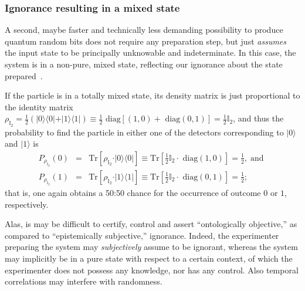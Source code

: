 \documentclass[%
 preprint,
 showpacs,
 showkeys,
 preprintnumbers,
 amsmath,amssymb,
 aps,
 prl,
  longbibliography,
 ]{revtex4-1}
\begin{document}
\subsubsection{Ignorance resulting in a mixed state}

A second, maybe faster and technically less demanding possibility to produce quantum random bits
does not require any preparation step, but just {\em assumes}
the input state to be principally unknowable and indeterminate.
In this case, the system is in a non-pure, mixed state,
reflecting our ignorance about the state prepared~\cite[2nd part, \S~10, p.~827]{schrodinger}.


If the particle is in a totally mixed state,
its density matrix is just proportional to the identity matrix
$\rho_{\mathbb{I}_2 }=\frac{1}{2}\left(
\vert 0 \rangle \langle  0 \vert + \vert 1  \rangle \langle  1 \vert
\right) \equiv \frac{1}{2} \textrm{ diag}\left[\left(1,0 \right) +\textrm{ diag}\left(0,1 \right)\right] = \frac{1}{2}\mathbb{I}_2   $,
and thus the probability to find the particle in either one of the detectors corresponding to
$\vert 0 \rangle $ and
$\vert 1  \rangle $ is
\begin{equation}
\begin{array}{rcl}
P_{\rho_{\mathbb{I}_2 }}(0)&=&
\textrm{Tr} \left[
\rho_{\mathbb{I}_2 } \cdot \vert 0 \rangle \langle  0 \vert
\right]
\equiv
\textrm{Tr}
\left[
\frac{1}{2}\mathbb{I}_2
\cdot
\textrm{ diag}\left(1,0 \right)
\right]
=\frac{1}{2},\;\textrm{
and } \\[2ex]
P_{\rho_{\mathbb{I}_2 }}(1)&=&
\textrm{Tr} \left[
\rho_{\mathbb{I}_2 } \cdot \vert 1  \rangle \langle  1 \vert
\right]
\equiv
\textrm{Tr}
\left[
\frac{1}{2}\mathbb{I}_2
\cdot
\textrm{ diag}\left(0,1 \right)
\right]
=\frac{1}{2};
\end{array}
\end{equation}
that is, one again obtains a 50:50 chance for the occurrence of outcome $0$ or $1$, respectively.



Alas, is may be difficult to certify, control and assert ``ontologically objective,'' as compared to ``epistemically subjective,'' ignorance.
Indeed, the experimenter
preparing the system may {\em subjectively} assume to be ignorant,
whereas the system may implicitly be in a pure state with respect to a certain context, of which
the experimenter does not possess any knowledge, nor has any control.
Also temporal correlations may interfere with randomness.
\end{document}
